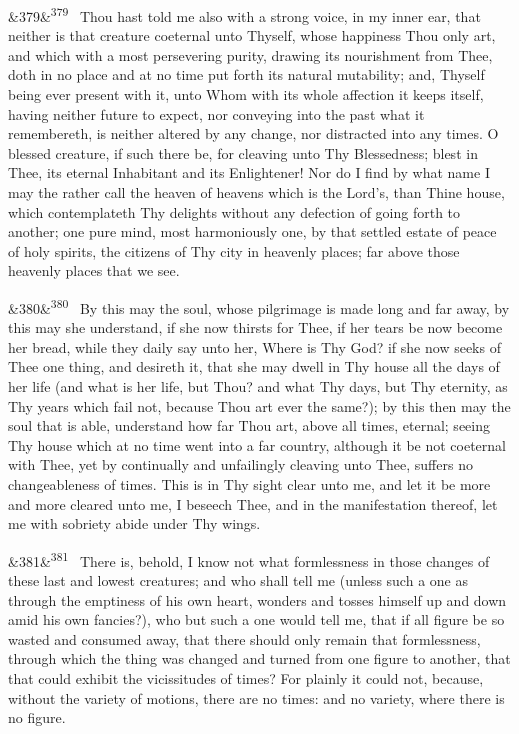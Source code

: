 \documentclass[12pt]{article}
\newcommand{\para}[1][]{\par\noindent\ifx&#1&\else\textsuperscript{\footnotesize #1}~\fi}
\begin{document}
\para[379] Thou hast told me also with a strong voice, in my inner ear, that neither is that creature coeternal unto Thyself, whose happiness Thou only art, and which with a most persevering purity, drawing its nourishment from Thee, doth in no place and at no time put forth its natural mutability; and, Thyself being ever present with it, unto Whom with its whole affection it keeps itself, having neither future to expect, nor conveying into the past what it remembereth, is neither altered by any change, nor distracted into any times. O blessed creature, if such there be, for cleaving unto Thy Blessedness; blest in Thee, its eternal Inhabitant and its Enlightener! Nor do I find by what name I may the rather call the heaven of heavens which is the Lord's, than Thine house, which contemplateth Thy delights without any defection of going forth to another; one pure mind, most harmoniously one, by that settled estate of peace of holy spirits, the citizens of Thy city in heavenly places; far above those heavenly places that we see.

\para[380] By this may the soul, whose pilgrimage is made long and far away, by this may she understand, if she now thirsts for Thee, if her tears be now become her bread, while they daily say unto her, Where is Thy God? if she now seeks of Thee one thing, and desireth it, that she may dwell in Thy house all the days of her life (and what is her life, but Thou? and what Thy days, but Thy eternity, as Thy years which fail not, because Thou art ever the same?); by this then may the soul that is able, understand how far Thou art, above all times, eternal; seeing Thy house which at no time went into a far country, although it be not coeternal with Thee, yet by continually and unfailingly cleaving unto Thee, suffers no changeableness of times. This is in Thy sight clear unto me, and let it be more and more cleared unto me, I beseech Thee, and in the manifestation thereof, let me with sobriety abide under Thy wings.

\para[381] There is, behold, I know not what formlessness in those changes of these last and lowest creatures; and who shall tell me (unless such a one as through the emptiness of his own heart, wonders and tosses himself up and down amid his own fancies?), who but such a one would tell me, that if all figure be so wasted and consumed away, that there should only remain that formlessness, through which the thing was changed and turned from one figure to another, that that could exhibit the vicissitudes of times? For plainly it could not, because, without the variety of motions, there are no times: and no variety, where there is no figure.
\end{document}
